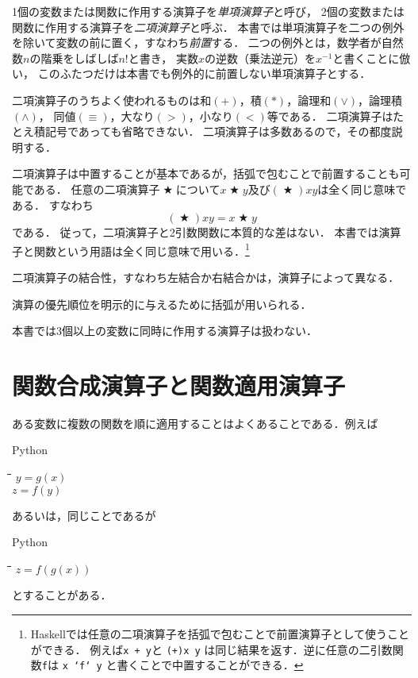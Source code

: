 \documentclass[twocolumn]{jsbook}
\newcommand{\programminglanguage}[1]{\textsf{#1}}
\newcommand{\haskell}{\programminglanguage{Haskell}}
\newcommand{\python}{\programminglanguage{Python}}
\newcommand{\code}[1]{\texttt{#1}}
\newcommand{\keyword}[1]{{\emph{#1}}}
\newenvironment{pythoncode}{\begin{itembox}[r]{\python}}{\end{itembox}}
\newenvironment{pythontab}{\begin{tabbing}\hspace*{1em}\=\hspace*{1em}\=\hspace*{1em}\=\hspace*{1em}\=\kill}{\end{tabbing}}
\DeclareMathOperator{\mathAnyBinaryOperator}{\bigstar}
\begin{document}
1個の変数または関数に作用する演算子を\keyword{単項演算子}と呼び，
2個の変数または関数に作用する演算子を\keyword{二項演算子}と呼ぶ．
本書では単項演算子を二つの例外を除いて変数の前に置く，すなわち\keyword{前置}する．
二つの例外とは，数学者が自然数$n$の階乗をしばしば$n!$と書き，
実数$x$の逆数（乗法逆元）を$x^{-1}$と書くことに倣い，
このふたつだけは本書でも例外的に前置しない単項演算子とする．

二項演算子のうちよく使われるものは和$(+)$，積$(*)$，論理和$(\vee)$，論理積$(\wedge)$，
同値$(\equiv)$，大なり$(>)$，小なり$(<)$等である．
二項演算子はたとえ積記号であっても省略できない．
二項演算子は多数あるので，その都度説明する．

二項演算子は中置することが基本であるが，括弧で包むことで前置することも可能である．
任意の二項演算子$\mathAnyBinaryOperator$について$x\mathAnyBinaryOperator y$及び$\left(\mathAnyBinaryOperator\right)xy$は全く同じ意味である．
すなわち
\begin{equation}
\left(\mathAnyBinaryOperator\right)xy=x\mathAnyBinaryOperator y
\end{equation}
である．
従って，二項演算子と2引数関数に本質的な差はない．
本書では演算子と関数という用語は全く同じ意味で用いる．\footnote{\haskell では任意の二項演算子を括弧で包むことで前置演算子として使うことができる．
例えば\code{x + y}と \code{(+)x y} は同じ結果を返す．逆に任意の二引数関数\code{f}は \code{x `f` y} と書くことで中置することができる．}

二項演算子の結合性，すなわち左結合か右結合かは，演算子によって異なる．

演算の優先順位を明示的に与えるために括弧が用いられる．

本書では3個以上の変数に同時に作用する演算子は扱わない．

\section{関数合成演算子と関数適用演算子}

ある変数に複数の関数を順に適用することはよくあることである．例えば
\begin{pythoncode}
\begin{pythontab}
$y=g(x)$\\
$z=f(y)$
\end{pythontab}
\end{pythoncode}
あるいは，同じことであるが
\begin{pythoncode}
\begin{pythontab}
$z=f(g(x))$
\end{pythontab}
\end{pythoncode}
とすることがある．
\end{document}

